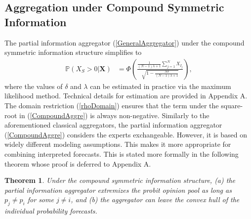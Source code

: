 \documentclass[11pt]{article}
\renewcommand{\P}{\mathbb{P}}
\newtheorem{theorem}{Theorem}[section]
\theoremstyle{definition}
\theoremstyle{definition}
\begin{document}
\subsection{Aggregation under Compound Symmetric Information}
\label{compound2}
The partial information aggregator (\ref{GeneralAggregator}) under the compound symmetric information structure simplifies to
\begin{align}
\P\left(X_S > 0 | \boldsymbol{X}\right) &=\Phi\left(\frac{\frac{1}{(N-1)\lambda +1} \sum_{j=1}^N X_{I_j} }{\sqrt{1- \frac{N\delta}{(N-1)\lambda +1} }}  \right), \label{CompoundAggre}
\end{align}
where  the values of $\delta$ and $\lambda$ can be estimated in practice via the maximum likelihood method. Technical details for estimation  are provided in Appendix A.
The domain restriction (\ref{rhoDomain}) ensures that the term under the square-root in (\ref{CompoundAggre}) is always non-negative. Similarly to the aforementioned classical aggregators,  the partial information aggregator (\ref{CompoundAggre}) considers the experts exchangeable. However, it is based on widely different modeling assumptions. This makes it more appropriate for combining interpreted forecasts. This is stated more formally in the following theorem whose proof is deferred to Appendix A. 

\begin{theorem}
\label{positiveThm}
Under the compound symmetric information structure, (a) the partial information aggregator extremizes the probit opinion pool as long as $p_j \neq p_i$ for some $j \neq i$, and (b) the aggregator can leave the convex hull of the individual probability forecasts. 
\end{theorem}
\end{document}
